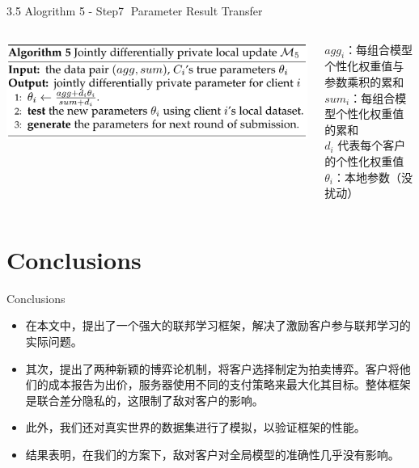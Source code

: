 \documentclass{sintefbeamer}
\theoremstyle{definition}
\begin{document}
\begin{frame}{3.5 Alogrithm 5 - Step\textcircled{7} Parameter Result Transfer}{\empty}
\begin{columns}
\begin{column}{0.5\textwidth}
\vspace{0.5em}
\includegraphics[width=1\textwidth]{images/algo5}
\end{column}
\begin{column}{0.5\textwidth}
$agg_i$：每组合模型个性化权重值与参数乘积的累和\\
$sum_i$：每组合模型个性化权重值的累和\\
$d_i$ 代表每个客户的个性化权重值\\
$\theta_i$：本地参数（没扰动）\\
\end{column}
\end{columns}
\end{frame}






\section{Conclusions}

\begin{frame}{Conclusions}


\begin{itemize}
    \item 在本文中，提出了一个强大的联邦学习框架，解决了激励客户参与联邦学习的实际问题。
    \item 其次，提出了两种新颖的博弈论机制，将客户选择制定为拍卖博弈。客户将他们的成本报告为出价，服务器使用不同的支付策略来最大化其目标。整体框架是联合差分隐私的，这限制了敌对客户的影响。
    \item 此外，我们还对真实世界的数据集进行了模拟，以验证框架的性能。
    \item 结果表明，在我们的方案下，敌对客户对全局模型的准确性几乎没有影响。
  \end{itemize}
  
\end{frame}



\backmatter
\end{document}
